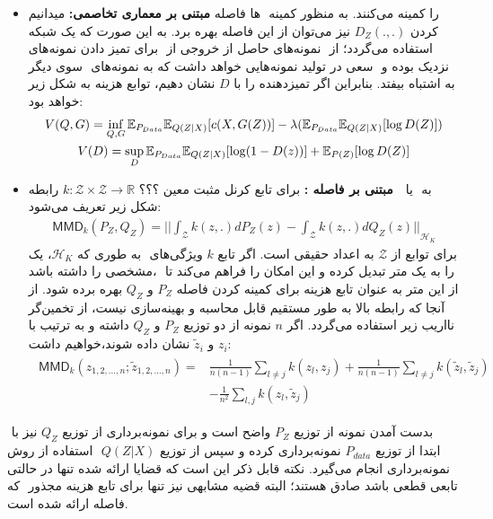 \begin{itemize}
	\item \textbf{مبتنی بر معماری تخاصمی:}
	      میدانیم ‎\gan{}‎‌ها فاصله ‎‎ را کمینه می‌کنند. به منظور کمینه کردن $D_Z(. , .)$ نیز می‌توان از این فاصله بهره برد. به این صورت که یک شبکه ‎\discriminator{}‎ برای تمیز دادن نمونه‌های ‎\priordist{}‎ از ‎‎نمونه‌های حاصل از خروجی ‎\encoder{}‎ استفاده می‌گردد؛ از سوی دیگر ‎\encoder{}‎ سعی در تولید نمونه‌هایی خواهد داشت که به نمونه‌های ‎\priordist{}‎ نزدیک بوده و ‎\discriminator{}‎ به اشتباه بیفتد. بنابراین اگر تمیزدهنده را با $D$ نشان دهیم، توابع هزینه به شکل زیر خواهد بود:
	      \begin{gather}
		      V(Q, G)= \inf_{Q, G} \mathbb E_{P_{Data}}\mathbb E_{Q(Z|X)} [c(X, G(Z))] - \lambda (\mathbb E_{P_{Data}}\mathbb E_{Q(Z|X)} [\log D(Z)]) \nonumber \\
		      V(D)= \sup_{D} \mathbb E_{P_{Data}}\mathbb E_{Q(Z|X)} [\log (1-D(z))] + \mathbb E_{P(Z)} [\log D(Z)]
	      \end{gather}
	\item \textbf{مبتنی بر فاصله \mmd :}
	      برای تابع کرنل مثبت معین  ؟؟؟
	      $k: ‎\mathcal{Z} ‎‎\times \mathcal{Z} ‎\rightarrow ‎\mathbb{R}‎‎$
	      رابطه ‎\mmd{} ‎ یا ‎ به شکل زیر تعریف می‌شود:
	      \begin{gather}
		      \mathsf{MMD}_k(P_Z, Q_Z) = {\vert \vert \int_\mathcal{Z} k(z, .) dP_Z(z) - \int_\mathcal{Z} k(z, .) dQ_Z(z) \vert \vert}_{\mathcal{H}_K}
	      \end{gather}
	      به طوری که $‎\mathcal{H}‎_K$، یک  ‎‎ برای توابع از $‎\mathcal{Z}‎$ به اعداد حقیقی است. اگر تابع $k$ ویژگی‌های مشخصی را داشته باشد، ‎\mmd{}‎ را به یک متر تبدیل کرده و این امکان را فراهم می‌کند تا از این متر به عنوان تابع هزینه برای کمینه کردن فاصله $P_Z$  و $Q_Z$  بهره برده شود. از آنجا که رابطه بالا به طور مستقیم قابل محاسبه و بهینه‌سازی نیست، از تخمین‌گر نااریب زیر استفاده می‌گردد. اگر $n$ نمونه از دو توزیع $P_Z$ و $Q_Z$ داشته و به ترتیب با $z_i$ و $‎\tilde{z}_i$ نشان داده شوند،‌خواهیم داشت:
	      \begin{gather}
		      \begin{align*}
			      \mathsf{MMD}_k(z_{1,2,...,n};\tilde{z}_{1,2,...,n}) = & \frac{1}{n(n-1)} \sum_{l \neq j} k(z_l, z_j) +
			      \frac{1}{n(n-1)} \sum_{l \neq j} k(\tilde{z}_l, \tilde{z}_j)                                              \\
			                                                            & - \frac{1}{n ^ 2} \sum_{l, j} k(z_l, \tilde{z}_j)
		      \end{align*}
	      \end{gather}
\end{itemize}‎
بدست آمدن نمونه از توزیع $P_Z$ واضح است و برای نمونه‌برداری از توزیع $Q_Z$ نیز با استفاده از روش
‎ ابتدا از توزیع $P_{data}‎$ نمونه‌برداری کرده و سپس از توزیع $Q(Z|X)$ نمونه‌برداری انجام می‌گیرد.
نکته قابل ذکر این است که قضایا ارائه شده تنها در حالتی که ‎\decoder{}‎ تابعی قطعی باشد صادق هستند؛ البته قضیه مشابهی نیز تنها برای تابع هزینه مجذور فاصله ارائه شده است.
